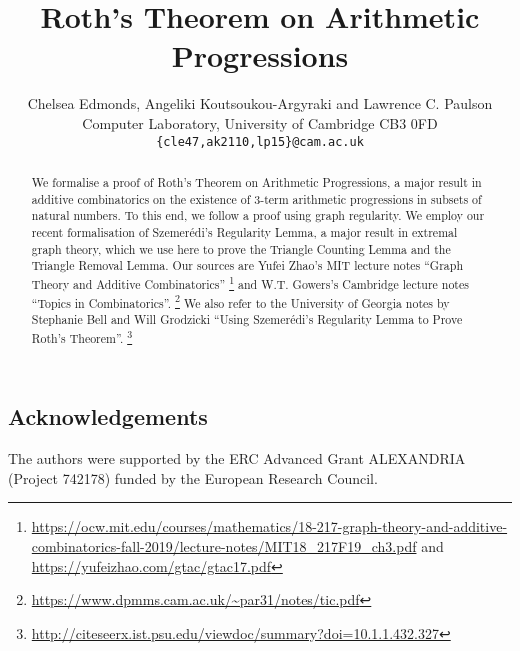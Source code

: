 \documentclass[11pt,a4paper]{article}
\begin{document}
\title{Roth's Theorem on Arithmetic Progressions}
\author{Chelsea Edmonds, Angeliki Koutsoukou-Argyraki and Lawrence C. Paulson\\
Computer Laboratory, University of Cambridge CB3 0FD\\
\texttt{\{cle47,ak2110,lp15\}@cam.ac.uk}}

\maketitle

\begin{abstract}
We formalise a proof of Roth's Theorem on Arithmetic Progressions, a major result in additive 
combinatorics on the existence of 3-term arithmetic progressions in subsets of natural numbers.
To this end, we follow a proof using graph regularity. We employ our recent formalisation of Szemer\'{e}di's 
Regularity Lemma, a major result in extremal graph theory, which we use here to prove
the Triangle Counting Lemma and the Triangle Removal Lemma. 
Our sources are Yufei Zhao's MIT lecture notes ``Graph Theory and Additive Combinatorics''%
\footnote{\url{https://ocw.mit.edu/courses/mathematics/18-217-graph-theory-and-additive-combinatorics-fall-2019/lecture-notes/MIT18_217F19_ch3.pdf} and \url{https://yufeizhao.com/gtac/gtac17.pdf}}
and W.T. Gowers's Cambridge lecture notes ``Topics in Combinatorics''.%
\footnote{\url{https://www.dpmms.cam.ac.uk/~par31/notes/tic.pdf}}
We also refer to the University of Georgia notes by Stephanie Bell and Will Grodzicki
``Using Szemerédi's Regularity Lemma to Prove Roth's Theorem''.%
\footnote{\url{http://citeseerx.ist.psu.edu/viewdoc/summary?doi=10.1.1.432.327}}
\end{abstract}

\tableofcontents

\subsection*{Acknowledgements}
The authors were supported by the ERC Advanced Grant ALEXANDRIA (Project 742178) funded by the European Research Council. 

\newpage


\end{document}
